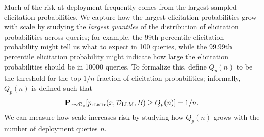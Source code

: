 Much of the risk at deployment frequently comes from the largest sampled elicitation probabilities.  
We capture how the largest elicitation probabilities grow with scale by studying the \emph{largest quantiles} of the distribution of elicitation probabilities across queries; for example, the 99th percentile elicitation probability might tell us what to expect in 100 queries, while the 99.99th percentile elicitation probability might indicate how large the elicitation probabilities should be in 10000 queries. 
To formalize this, define $Q_p(n)$ to be the threshold for the top $1/n$ fraction of elicitation probabilities; informally, $Q_p(n)$ is defined such that
\begin{align}
    \mathbf{P}_{x \sim \mathcal{D}_{x}} [p_{\textsc{elicit}}(x; \mathcal{D}_\text{LLM}, B) \geq Q_p(n)] = 1/n.
\end{align}
We can measure how scale increases risk by studying how $Q_p(n)$ grows with the number of deployment queries $n$. 

